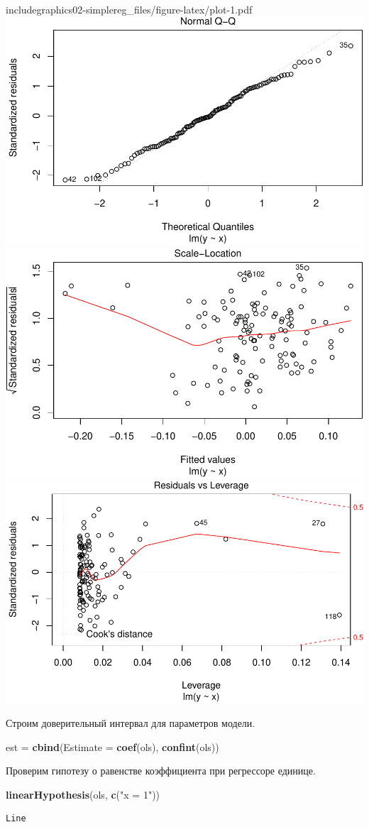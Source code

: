 \documentclass[]{book}
\newenvironment{Shaded}{\begin{snugshade}}{\end{snugshade}}
\newcommand{\DataTypeTok}[1]{\textcolor[rgb]{0.13,0.29,0.53}{#1}}
\newcommand{\KeywordTok}[1]{\textcolor[rgb]{0.13,0.29,0.53}{\textbf{#1}}}
\newcommand{\NormalTok}[1]{#1}
\newcommand{\StringTok}[1]{\textcolor[rgb]{0.31,0.60,0.02}{#1}}
\begin{document}
includegraphics{02-simplereg_files/figure-latex/plot-1.pdf} \includegraphics{02-simplereg_files/figure-latex/plot-2.pdf} \includegraphics{02-simplereg_files/figure-latex/plot-3.pdf} \includegraphics{02-simplereg_files/figure-latex/plot-4.pdf}

Строим доверительный интервал для параметров модели.

\begin{Shaded}
\begin{Highlighting}[]
\NormalTok{est =}\StringTok{ }\KeywordTok{cbind}\NormalTok{(}\DataTypeTok{Estimate =} \KeywordTok{coef}\NormalTok{(ols), }\KeywordTok{confint}\NormalTok{(ols))}
\end{Highlighting}
\end{Shaded}

Проверим гипотезу о равенстве коэффициента при регрессоре единице.

\begin{Shaded}
\begin{Highlighting}[]
\KeywordTok{linearHypothesis}\NormalTok{(ols, }\KeywordTok{c}\NormalTok{(}\StringTok{"x = 1"}\NormalTok{))}
\end{Highlighting}
\end{Shaded}

\begin{verbatim}
Line
\end{verbatim}
\end{document}
